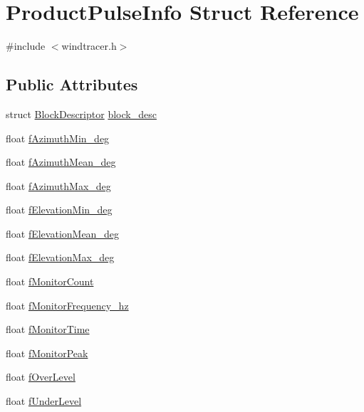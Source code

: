\hypertarget{structProductPulseInfo}{\section{Product\-Pulse\-Info Struct Reference}
\label{structProductPulseInfo}
}


{\ttfamily \#include $<$windtracer.\-h$>$}

\subsection*{Public Attributes}
\begin{DoxyCompactItemize}
\item 
struct \hyperlink{structBlockDescriptor}{Block\-Descriptor} \hyperlink{structProductPulseInfo_a643f5aab4f0ca778b5fa7893b8d5c6b7}{block\-\_\-desc}
\item 
float \hyperlink{structProductPulseInfo_ad76848dc6a038ffeb3f15c62fec8455d}{f\-Azimuth\-Min\-\_\-deg}
\item 
float \hyperlink{structProductPulseInfo_a507c4695328a2597877ae114bbdb13a4}{f\-Azimuth\-Mean\-\_\-deg}
\item 
float \hyperlink{structProductPulseInfo_a06e33120f4732487c2a81ebb7e76b39c}{f\-Azimuth\-Max\-\_\-deg}
\item 
float \hyperlink{structProductPulseInfo_a5e997878f8ce52b97776a3290e2a273d}{f\-Elevation\-Min\-\_\-deg}
\item 
float \hyperlink{structProductPulseInfo_af393f65a2e91f9773259363052fea600}{f\-Elevation\-Mean\-\_\-deg}
\item 
float \hyperlink{structProductPulseInfo_a1435a9578e350733fcee5b675880b126}{f\-Elevation\-Max\-\_\-deg}
\item 
float \hyperlink{structProductPulseInfo_a0733a1c53efc51021ad8b84a0a9461fd}{f\-Monitor\-Count}
\item 
float \hyperlink{structProductPulseInfo_a0d1baf252daa7ed5eccb69c97ceccb2a}{f\-Monitor\-Frequency\-\_\-hz}
\item 
float \hyperlink{structProductPulseInfo_a1f8a1cf26e1708ac73d110597b174c0a}{f\-Monitor\-Time}
\item 
float \hyperlink{structProductPulseInfo_af58303a59fde2922eb2080d7917bad0c}{f\-Monitor\-Peak}
\item 
float \hyperlink{structProductPulseInfo_a7e101db9e9982b6e69660e798c557eeb}{f\-Over\-Level}
\item 
float \hyperlink{structProductPulseInfo_a0abe1437dacaa329d16026ecd00c171f}{f\-Under\-Level}
\end{DoxyCompactItemize}


